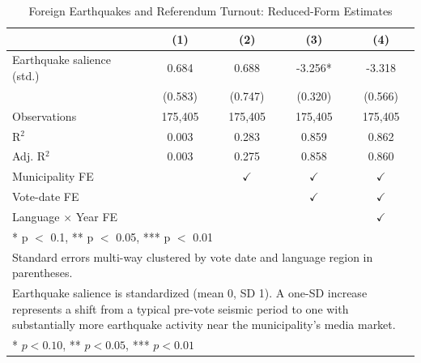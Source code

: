 \begin{table}
\centering
\caption{Foreign Earthquakes and Referendum Turnout: Reduced-Form Estimates \label{tab:reduced}}
\centering
\begin{tabular}[t]{lcccc}
\toprule
  & (1) & (2) & (3) & (4)\\
\midrule
Earthquake salience (std.) & 0.684 & 0.688 & -3.256* & -3.318\\
 & (0.583) & (0.747) & (0.320) & (0.566)\\
\midrule
Observations & 175,405 & 175,405 & 175,405 & 175,405\\
R$^2$ & 0.003 & 0.283 & 0.859 & 0.862\\
Adj. R$^2$ & 0.003 & 0.275 & 0.858 & 0.860\\
Municipality FE &  & $\checkmark$ & $\checkmark$ & $\checkmark$\\
Vote-date FE &  &  & $\checkmark$ & $\checkmark$\\
Language $\times$ Year FE &  &  &  & $\checkmark$\\
\bottomrule
\multicolumn{5}{p{0.95\textwidth}}{\rule{0pt}{1em}* p $<$ 0.1, ** p $<$ 0.05, *** p $<$ 0.01}\\
\multicolumn{5}{p{0.95\textwidth}}{\rule{0pt}{1em}Standard errors multi-way clustered by vote date and language region in parentheses.}\\
\multicolumn{5}{p{0.95\textwidth}}{\rule{0pt}{1em}Earthquake salience is standardized (mean 0, SD 1). A one-SD increase represents a shift from a typical pre-vote seismic period to one with substantially more earthquake activity near the municipality's media market.}\\
\multicolumn{5}{p{0.95\textwidth}}{\rule{0pt}{1em}* $p<0.10$, ** $p<0.05$, *** $p<0.01$}\\
\end{tabular}
\end{table}
